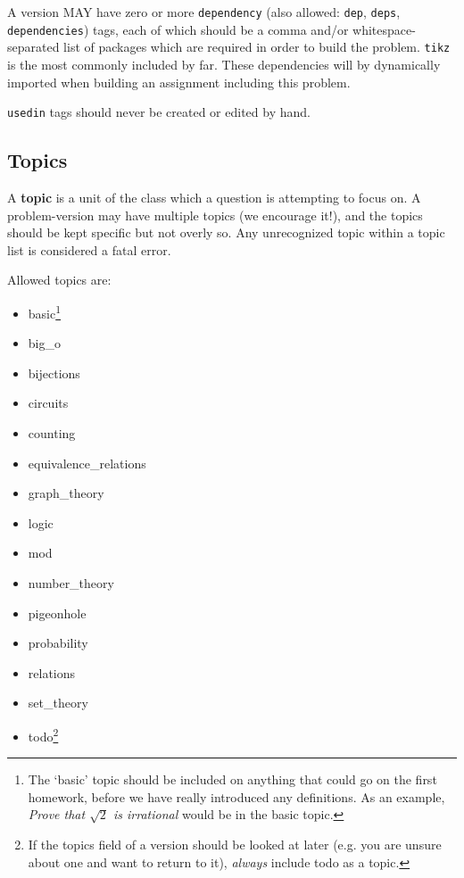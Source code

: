     A version MAY have zero or more \texttt{dependency} (also allowed: \texttt{dep}, \texttt{deps}, \texttt{dependencies}) tags, each of which should be a comma and/or whitespace-separated list of packages which are required in order to build the problem. \texttt{tikz} is the most commonly included by far. These dependencies will by dynamically imported when building an assignment including this problem.
    
    \texttt{usedin} tags should never be created or edited by hand.
  
  \subsection{Topics}
    A \textbf{topic} is a unit of the class which a question is attempting to focus on. A problem-version may have multiple topics (we encourage it!), and the topics should be kept specific but not overly so. Any unrecognized topic within a topic list is considered a fatal error.
    
    Allowed topics are:
    \begin{itemize}\itemsep0pt
      \item basic\footnote{The `basic' topic should be included on anything that could go on the first homework, before we have really introduced any definitions. As an example, \textit{Prove that $\sqrt 2$ is irrational} would be in the basic topic.}
      \item big\_o
      \item bijections
      \item circuits
      \item counting
      \item equivalence\_relations
      \item graph\_theory
      \item logic
      \item mod
      \item number\_theory
      \item pigeonhole
      \item probability
      \item relations
      \item set\_theory
      \item todo\footnote{If the topics field of a version should be looked at later (e.g. you are unsure about one and want to return to it), \textit{always} include todo as a topic.}
    \end{itemize}
    
